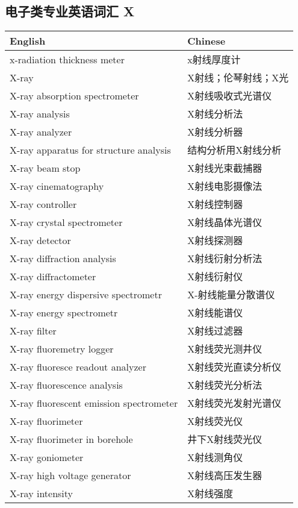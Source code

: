 \documentclass[
]{article}
\begin{document}
\hypertarget{ux7535ux5b50ux7c7bux4e13ux4e1aux82f1ux8bedux8bcdux6c47-x}{%
\subsection{电子类专业英语词汇
X}\label{ux7535ux5b50ux7c7bux4e13ux4e1aux82f1ux8bedux8bcdux6c47-x}}

\begin{longtable}[]{@{}ll@{}}
\toprule()
English & Chinese \\
\midrule()
\endhead
x-radiation thickness meter & x射线厚度计 \\
X-ray & X射线；伦琴射线；X光 \\
X-ray absorption spectrometer & X射线吸收式光谱仪 \\
X-ray analysis & X射线分析法 \\
X-ray analyzer & X射线分析器 \\
X-ray apparatus for structure analysis & 结构分析用X射线分析 \\
X-ray beam stop & X射线光束截捕器 \\
X-ray cinematography & X射线电影摄像法 \\
X-ray controller & X射线控制器 \\
X-ray crystal spectrometer & X射线晶体光谱仪 \\
X-ray detector & X射线探测器 \\
X-ray diffraction analysis & X射线衍射分析法 \\
X-ray diffractometer & X射线衍射仪 \\
X-ray energy dispersive spectrometr & X-射线能量分散谱仪 \\
X-ray energy spectrometr & X射线能谱仪 \\
X-ray filter & X射线过滤器 \\
X-ray fluoremetry logger & X射线荧光测井仪 \\
X-ray fluoresce readout analyzer & X射线荧光直读分析仪 \\
X-ray fluorescence analysis & X射线荧光分析法 \\
X-ray fluorescent emission spectrometer & X射线荧光发射光谱仪 \\
X-ray fluorimeter & X射线荧光仪 \\
X-ray fluorimeter in borehole & 井下X射线荧光仪 \\
X-ray goniometer & X射线测角仪 \\
X-ray high voltage generator & X射线高压发生器 \\
X-ray intensity & X射线强度 \\

\end{longtable}
\end{document}
